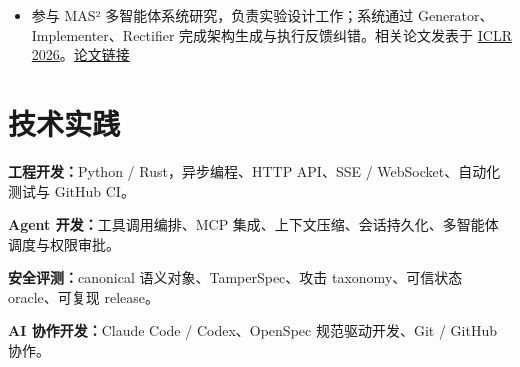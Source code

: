 \documentclass{resume}
\newcommand{\projectlink}[2]{\href{#1}{\textcolor{muted}{#2}}}
\newcommand{\cvsection}[2]{\section{\texorpdfstring{\makebox[1.35em][l]{\normalfont #1}}{}#2}}
\begin{document}
\begin{itemize}
  \item 参与 MAS² 多智能体系统研究，负责实验设计工作；系统通过 Generator、Implementer、Rectifier 完成架构生成与执行反馈纠错。相关论文发表于 \href{https://iclr.cc/virtual/2026/poster/10007200}{ICLR 2026}。\quad\projectlink{https://openreview.net/forum?id=qumy27hMDY}{论文链接}
\end{itemize}

\cvsection{\faCogs}{技术实践}
\textbf{工程开发：}Python / Rust，异步编程、HTTP API、SSE / WebSocket、自动化测试与 GitHub CI。\par
\textbf{Agent 开发：}工具调用编排、MCP 集成、上下文压缩、会话持久化、多智能体调度与权限审批。\par
\textbf{安全评测：}canonical 语义对象、TamperSpec、攻击 taxonomy、可信状态 oracle、可复现 release。\par
\textbf{AI 协作开发：}Claude Code / Codex、OpenSpec 规范驱动开发、Git / GitHub 协作。
\end{document}
